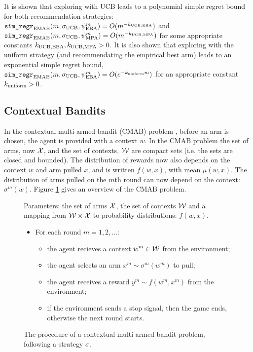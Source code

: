         It is shown that exploring with UCB leads to a polynomial simple regret bound for both recommendation strategies: ${\textnormal{\texttt{sim\_regr}}}_{{\textnormal{EMAB}}}(m,\sigma_{{\textnormal{UCB}}},\psi^m_{{\textnormal{EBA}}}) = O(m^{-k_{{\textnormal{UCB}},{\textnormal{EBA}}}})$ and ${\textnormal{\texttt{sim\_regr}}}_{{\textnormal{EMAB}}}(m,\sigma_{{\textnormal{UCB}}},\psi^m_{{\textnormal{MPA}}}) = O(m^{-k_{{\textnormal{UCB}},{\textnormal{MPA}}}})$ for some appropriate constants $k_{{\textnormal{UCB}},{\textnormal{EBA}}},k_{{\textnormal{UCB}},{\textnormal{MPA}}}>0$. It is also shown that exploring with the uniform strategy (and recommendating the empirical best arm) leads to an exponential simple regret bound, ${\textnormal{\texttt{sim\_regr}}}_{{\textnormal{EMAB}}}(m,\sigma_{{\textnormal{UCB}}},\psi^m_{{\textnormal{EBA}}}) = O(e^{-k_{{\textnormal{uniform}}}m})$ for an appropriate constant $k_{{\textnormal{uniform}}}>0$.



    
    \subsection{Contextual Bandits}
    \label{sec:2-1-2-contextual-mab}

        In the contextual multi-armed bandit (CMAB) problem \cite{cz,cz_long}, before an arm is chosen, the agent is provided with a context $w$. In the CMAB problem the set of arms, now $\mathcal{X}$, and the set of contexts, $\mathcal{W}$ are compact sets (i.e. the sets are closed and bounded). The distribution of rewards now also depends on the context $w$ and arm pulled $x$, and is written $f(w,x)$, with mean $\mu(w,x)$. The distribution of arms pulled on the $m$th round can now depend on the context: $\sigma^m(w)$. Figure \ref{fig:2:cmab_problem} gives an overview of the CMAB problem.

        \begin{figure}
            \begin{tcolorbox}
                Parameters: the set of arms $\mathcal{X}$, the set of contexts $\mathcal{W}$ and a mapping from $\mathcal{W}\times\mathcal{X}$ to probability distributions: $f(w,x)$.
                \begin{itemize}
                    \item For each round $m=1,2,...$:
                    \begin{itemize}
                        \item the agent recieves a context $w^m\in\mathcal{W}$ from the environment;
                        \item the agent selects an arm $x^m\sim\sigma^m(w^m)$ to pull;
                        \item the agent receives a reward $y^m \sim f(w^m,x^m)$ from the environment;
                        \item if the environment sends a stop signal, then the game ends, otherwise the next round starts.
                    \end{itemize} 
                \end{itemize}
            \end{tcolorbox}
            \caption{The procedure of a contextual multi-armed bandit problem, following a strategy $\sigma$.}
            \label{fig:2:cmab_problem}
        \end{figure}

